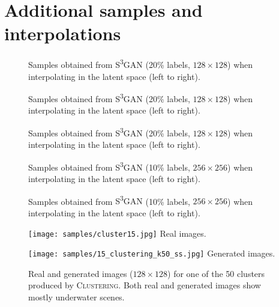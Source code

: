 \documentclass{article}
\newcommand{\tranSSS}{\textsc{S\textsuperscript{3}GAN}}
\newcommand{\tranC}{\textsc{Clustering}}
\begin{document}
\appendix
\onecolumn

\section{Additional samples and interpolations}\label{sec:samples}

\begin{figure}[h]
\centering
{}
\caption{Samples obtained from \tranSSS{} (20\% labels, $128\times128$) when interpolating in the latent space (left to right).\label{fig:s2-20-5}}
\end{figure}
\vspace{3cm}
\begin{figure}[h]
\centering
{}
\caption{Samples obtained from \tranSSS{} (20\% labels, $128\times128$) when interpolating in the latent space (left to right).\label{fig:s2-20-3}}
\end{figure}

\begin{figure}[h]
\centering
{}
\caption{Samples obtained from \tranSSS{} (20\% labels, $128\times128$) when interpolating in the latent space (left to right).\label{fig:s2-20-4}}
\end{figure}

\begin{figure}[h]
\centering
{}
\caption{Samples obtained from \tranSSS{} (10\% labels, $256\times256$) when interpolating in the latent space (left to right).\label{fig:s2-20-256-1}}
\end{figure}

\begin{figure}[h]
\centering
{}
\caption{Samples obtained from \tranSSS{} (10\% labels, $256\times256$) when interpolating in the latent space (left to right).\label{fig:s2-20-256-2}}
\end{figure}


\begin{figure*}[h]
    \centering
    \begin{minipage}{0.45\textwidth}
        \centering
        \texttt{[image: samples/cluster15.jpg]}
        {Real images.}
    \end{minipage}
    \begin{minipage}{0.45\textwidth}
        \centering
        \texttt{[image: samples/15\_clustering\_k50\_ss.jpg]}
        {Generated images.}
    \end{minipage}
    \caption{\label{fig:cluster15samples}Real and generated images ($128\times128$) for one of the 50 clusters produced by \tranC{}. Both real and generated images show mostly underwater scenes.}
\end{figure*}
\end{document}
